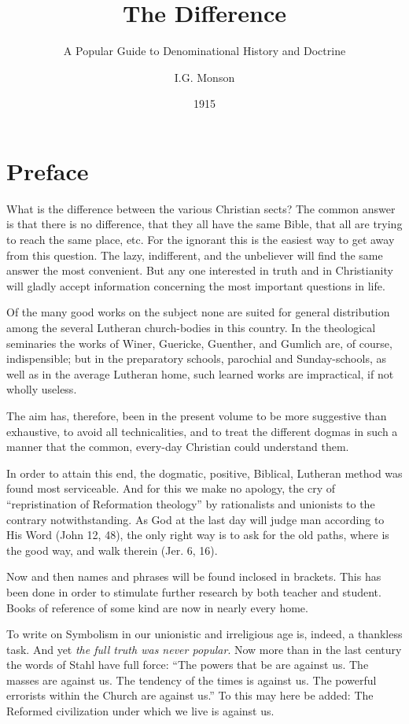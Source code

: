 \documentclass[
]{book}
\title{The Difference}
\subtitle{A Popular Guide to Denominational History and Doctrine}
\author{I.G. Monson}
\date{1915}
\begin{document}
\maketitle

{
\setcounter{tocdepth}{1}
\tableofcontents
}
\hypertarget{preface}{%
\chapter*{Preface}\label{preface}}

What is the difference between the various Christian sects? The common answer is that there is no difference, that they all have the same Bible, that all are trying to reach the same place, etc. For the ignorant this is the easiest way to get away from this question. The lazy, indifferent, and the unbeliever will find the same answer the most convenient. But any one interested in truth and in Christianity will gladly accept information concerning the most important questions in life.

Of the many good works on the subject none are suited for general distribution among the several Lutheran church-bodies in this country. In the theological seminaries the works of Winer, Guericke, Guenther, and Gumlich are, of course, indispensible; but in the preparatory schools, parochial and Sunday-schools, as well as in the average Lutheran home, such learned works are impractical, if not wholly useless.

The aim has, therefore, been in the present volume to be more suggestive than exhaustive, to avoid all technicalities, and to treat the different dogmas in such a manner that the common, every-day Christian could understand them.

In order to attain this end, the dogmatic, positive, Biblical, Lutheran method was found most serviceable. And for this we make no apology, the cry of ``repristination of Reformation theology'' by rationalists and unionists to the contrary notwithstanding. As God at the last day will judge man according to His Word (John 12, 48), the only right way is to ask for the old paths, where is the good way, and walk therein (Jer. 6, 16).

Now and then names and phrases will be found inclosed in brackets. This has been done in order to stimulate further research by both teacher and student. Books of reference of some kind are now in nearly every home.

To write on Symbolism in our unionistic and irreligious age is, indeed, a thankless task. And yet \emph{the full truth was never popular}. Now more than in the last century the words of Stahl have full force: ``The powers that be are against us. The masses are against us. The tendency of the times is against us. The powerful errorists within the Church are against us.'' To this may here be added: The Reformed civilization under which we live is against us.
\end{document}
